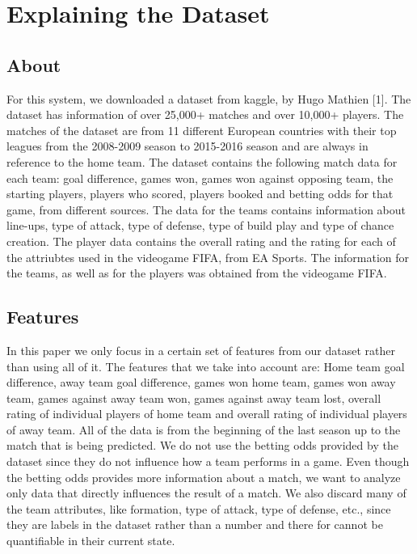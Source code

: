 \documentclass[10pt,journal,compsoc]{IEEEtran}
\begin{document}




\section{Explaining the Dataset}
\subsection{About}
For this system, we downloaded a dataset from kaggle, by Hugo Mathien [1]. The dataset has information of over 25,000+ matches and over 10,000+ players. The matches of the dataset are from 11 different European countries with their top leagues from the 2008-2009 season to 2015-2016 season and are always in reference to the home team. The dataset contains the following match data for each team: goal difference, games won, games won against opposing team, the starting players, players who scored, players booked and betting odds for that game, from different sources. The data for the teams contains information about line-ups, type of attack, type of defense, type of build play and type of chance creation. The player data contains the overall rating and the rating for each of the attriubtes used in the videogame FIFA, from EA Sports. The information for the teams, as well as for the players was obtained from the videogame FIFA.

\subsection{Features}
In this paper we only focus in a certain set of features from our dataset rather than using all of it. The features that we take into account are: Home team goal difference, away team goal difference, games won home team, games won away team, games against away team won, games against away team lost, overall rating of individual players of home team and overall rating of individual players of away team. All of the data is from the beginning of the last season up to the match that is being predicted. We do not use the betting odds provided by the dataset since they do not influence how a team performs in a game. Even though the betting odds provides more information about a match, we want to analyze only data that directly influences the result of a match. We also discard many of the team attributes, like formation, type of attack, type of defense, etc., since they are labels in the dataset rather than a number and there for cannot be quantifiable in their current state.
\end{document}
